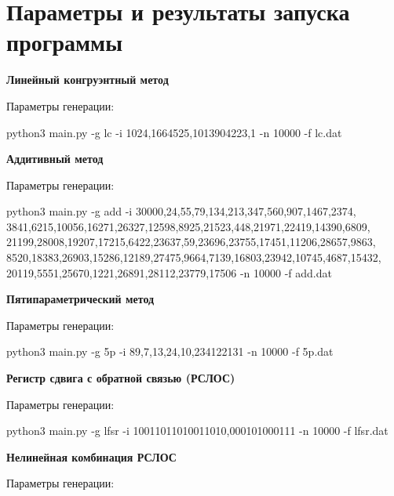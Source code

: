 \documentclass[spec, och, labwork]{shiza}
\begin{document}

  \section{Параметры и результаты запуска программы}

    \textbf{Линейный конгруэнтный метод}

    Параметры генерации:
 
  python3 main.py -g lc -i 1024,1664525,1013904223,1 -n 10000 -f lc.dat

  \vspace{5mm}
    \textbf{Аддитивный метод}

  Параметры генерации:

  python3 main.py -g add -i 30000,24,55,79,134,213,347,560,907,1467,2374,
  3841,6215,10056,16271,26327,12598,8925,21523,448,21971,22419,14390,6809,
  21199,28008,19207,17215,6422,23637,59,23696,23755,17451,11206,28657,9863,
  8520,18383,26903,15286,12189,27475,9664,7139,16803,23942,10745,4687,15432,
  20119,5551,25670,1221,26891,28112,23779,17506 -n 10000 -f add.dat
  \vspace{5mm}
 
    \textbf{Пятипараметрический метод}

  Параметры генерации:
 
  python3 main.py -g 5p -i 89,7,13,24,10,234122131 -n 10000 -f 5p.dat
  \vspace{5mm}

    \textbf{Регистр сдвига с обратной связью (РСЛОС)}

    Параметры генерации:
 
  python3 main.py -g lfsr -i 10011011010011010,000101000111 -n 10000 -f lfsr.dat
  \vspace{5mm}


    \textbf{Нелинейная комбинация РСЛОС}

    Параметры генерации:
\end{document}
